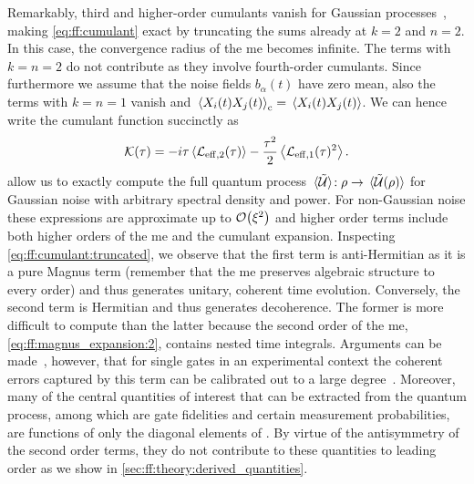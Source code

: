 Remarkably, third and higher-order cumulants vanish for Gaussian processes~\cite{Kubo1963,Szankowski2017}, making \cref{eq:ff:cumulant} exact by truncating the sums already at $k = 2$ and $n = 2$.
In this case, the convergence radius of the \gls{me} becomes infinite.
The terms with $k = n = 2$ do not contribute as they involve fourth-order cumulants.
Since furthermore we assume that the noise fields $b_\alpha(t)$ have zero mean, also the terms with $k = n = 1$ vanish and $\ev*{X_i(t)X_j(t)}_\mr{c}  =  \ev*{X_i(t)X_j(t)}$.
We can hence write the cumulant function succinctly as
\begin{equation}
    \cumulantfun(\tau) = - \i\tau\ev{\Li_{\mr{eff},2}(\tau)} - \frac{\tau^2}{2}\ev{\Li_{\mr{eff},1}(\tau)^2}  \label{eq:ff:cumulant:truncated}.
\end{equation}
 allow us to exactly compute the full quantum process $\ev*{\liouvUe}\!: \rho\rightarrow\ev*{\liouvUe(\rho)}$ for Gaussian noise with arbitrary spectral density and power.
For non-Gaussian noise these expressions are approximate up to $\order{\xi^2}$ and higher order terms include both higher orders of the \gls{me} and the cumulant expansion.
Inspecting \cref{eq:ff:cumulant:truncated}, we observe that the first term is anti-Hermitian as it is a pure Magnus term (remember that the \gls{me} preserves algebraic structure to every order) and thus generates unitary, coherent time evolution.
Conversely, the second term is Hermitian and thus generates decoherence.
The former is more difficult to compute than the latter because the second order of the \gls{me}, \cref{eq:ff:magnus_expansion:2}, contains nested time integrals.
Arguments can be made~\cite{Cerfontaine2021}, however, that for single gates in an experimental context the coherent errors captured by this term can be calibrated out to a large degree~\cite{Cerfontaine2020a,Kimmel2015}.
Moreover, many of the central quantities of interest that can be extracted from the quantum process, among which are gate fidelities and certain measurement probabilities, are functions of only the diagonal elements of \cumulantfun.
By virtue of the antisymmetry of the second order terms, they do not contribute to these quantities to leading order as we show in \cref{sec:ff:theory:derived_quantities}.

